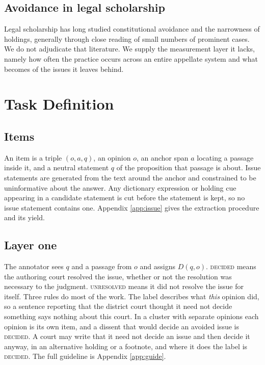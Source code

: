 \documentclass[11pt]{article}
\begin{document}
\subsection{Avoidance in legal scholarship} Legal scholarship has long studied
constitutional avoidance and the narrowness of holdings, generally through close
reading of small numbers of prominent cases. We do not adjudicate that
literature. We supply the measurement layer it lacks, namely how often the
practice occurs across an entire appellate system and what becomes of the issues
it leaves behind.

\section{Task Definition}
\label{sec:task}

\subsection{Items} An item is a triple $(o, a, q)$, an opinion $o$, an anchor
span $a$ locating a passage inside it, and a neutral statement $q$ of the
proposition that passage is about. Issue statements are generated from the text
around the anchor and constrained to be uninformative about the answer. Any
dictionary expression or holding cue appearing in a candidate statement is cut
before the statement is kept, so no issue statement contains one. Appendix
\ref{app:issue} gives the extraction procedure and its yield.

\subsection{Layer one} The annotator sees $q$ and a passage from $o$ and assigns
$D(q,o)$. \textsc{decided} means the authoring court resolved the issue, whether
or not the resolution was necessary to the judgment. \textsc{unresolved} means it
did not resolve the issue for itself. Three rules do most of the work.
The label describes what \emph{this} opinion did, so a sentence reporting that
the district court thought it need not decide something says nothing about this
court. In a cluster with separate opinions each opinion is its own item, and a
dissent that would decide an avoided issue is \textsc{decided}. A court may
write that it need not decide an issue and then decide it anyway, in an
alternative holding or a footnote, and where it does the label is
\textsc{decided}. The full guideline is Appendix
\ref{app:guide}.
\end{document}
